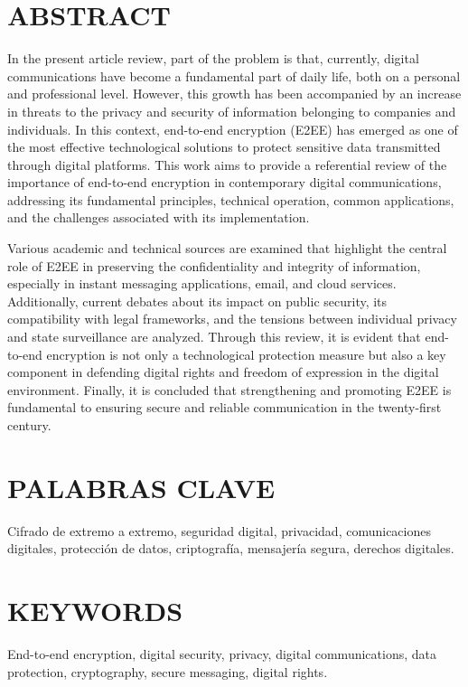 \documentclass[spanish,12pt,a4paper]{article}
\begin{document}
\begin{multicols}{2}
		\section*{\normalsize ABSTRACT}
		In the present article review, part of the problem is that, currently, digital communications have become a fundamental part of daily life, both on a personal and professional level. However, this growth has been accompanied by an increase in threats to the privacy and security of information belonging to companies and individuals. In this context, end-to-end encryption (E2EE) has emerged as one of the most effective technological solutions to protect sensitive data transmitted through digital platforms. This work aims to provide a referential review of the importance of end-to-end encryption in contemporary digital communications, addressing its fundamental principles, technical operation, common applications, and the challenges associated with its implementation.
		
		Various academic and technical sources are examined that highlight the central role of E2EE in preserving the confidentiality and integrity of information, especially in instant messaging applications, email, and cloud services. Additionally, current debates about its impact on public security, its compatibility with legal frameworks, and the tensions between individual privacy and state surveillance are analyzed. Through this review, it is evident that end-to-end encryption is not only a technological protection measure but also a key component in defending digital rights and freedom of expression in the digital environment. Finally, it is concluded that strengthening and promoting E2EE is fundamental to ensuring secure and reliable communication in the twenty-first century.
		
		\section*{\normalsize PALABRAS CLAVE}
		Cifrado de extremo a extremo, seguridad digital, privacidad, comunicaciones digitales, protección de datos, criptografía, mensajería segura, derechos digitales.
		\section*{\normalsize KEYWORDS}
		End-to-end encryption, digital security, privacy, digital communications, data protection, cryptography, secure messaging, digital rights.

\end{multicols}
\end{document}
